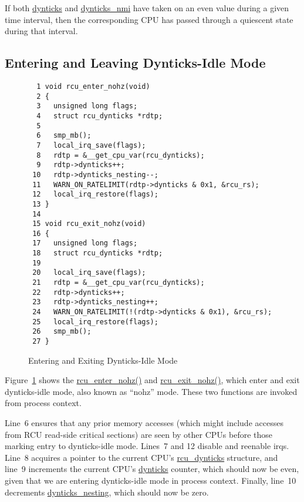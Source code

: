 If both \url{dynticks} and \url{dynticks_nmi} have taken on an even
value during a given time interval, then the corresponding CPU has
passed through a quiescent state during that interval.

 \QuickQuizEnd

\subsection{Entering and Leaving Dynticks-Idle Mode}
\label{app:formal:Entering and Leaving Dynticks-Idle Mode}

\begin{figure}[tbp]
{ \scriptsize
\begin{verbatim}
  1 void rcu_enter_nohz(void)
  2 {
  3   unsigned long flags;
  4   struct rcu_dynticks *rdtp;
  5 
  6   smp_mb();
  7   local_irq_save(flags);
  8   rdtp = &__get_cpu_var(rcu_dynticks);
  9   rdtp->dynticks++;
 10   rdtp->dynticks_nesting--;
 11   WARN_ON_RATELIMIT(rdtp->dynticks & 0x1, &rcu_rs);
 12   local_irq_restore(flags);
 13 }
 14 
 15 void rcu_exit_nohz(void)
 16 {
 17   unsigned long flags;
 18   struct rcu_dynticks *rdtp;
 19 
 20   local_irq_save(flags);
 21   rdtp = &__get_cpu_var(rcu_dynticks);
 22   rdtp->dynticks++;
 23   rdtp->dynticks_nesting++;
 24   WARN_ON_RATELIMIT(!(rdtp->dynticks & 0x1), &rcu_rs);
 25   local_irq_restore(flags);
 26   smp_mb();
 27 }
\end{verbatim}
}
\caption{Entering and Exiting Dynticks-Idle Mode}
\label{fig:app:formal:Entering and Exiting Dynticks-Idle Mode}
\end{figure}

Figure~\ref{fig:app:formal:Entering and Exiting Dynticks-Idle Mode}
shows the \url{rcu_enter_nohz()} and \url{rcu_exit_nohz()},
which enter and exit dynticks-idle mode, also known as ``nohz'' mode.
These two functions are invoked from process context.

Line~6 ensures that any prior memory accesses (which might
include accesses from RCU read-side critical sections) are seen
by other CPUs before those marking entry to dynticks-idle mode.
Lines~7 and 12 disable and reenable irqs.
Line~8 acquires a pointer to the current CPU's \url{rcu_dynticks}
structure, and
line~9 increments the current CPU's \url{dynticks} counter, which
should now be even, given that we are entering dynticks-idle mode
in process context.
Finally, line~10 decrements \url{dynticks_nesting}, which should now be zero.

